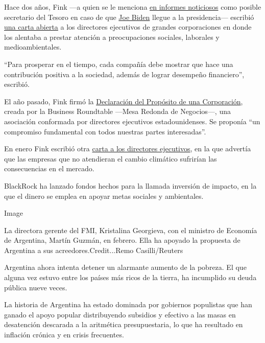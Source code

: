 Hace dos años, Fink ---a quien se le menciona
\href{https://www.cnbc.com/2020/04/06/biden-donors-float-elizabeth-warren-larry-fink-others-for-key-roles.html}{en
informes noticiosos} como posible secretario del Tesoro en caso de que
\href{https://www.nytimes.com/es/interactive/2020/espanol/estados-unidos/joe-biden-elecciones.html}{Joe
Biden} llegue a la presidencia--- escribió
\href{http://www.corporance.es/wp-content/uploads/2018/01/Larry-Fink-letter-to-CEOs-2018-1.pdf}{una
carta abierta} a los directores ejecutivos de grandes corporaciones en
donde los alentaba a prestar atención a preocupaciones sociales,
laborales y medioambientales.

``Para prosperar en el tiempo, cada compañía debe mostrar que hace una
contribución positiva a la sociedad, además de lograr desempeño
financiero'', escribió.

El año pasado, Fink firmó la
\href{https://www.nytimes.com/2019/08/19/business/business-roundtable-ceos-corporations.html}{Declaración
del Propósito de una Corporación}, creada por la Business Roundtable
---Mesa Redonda de Negocios---, una asociación conformada por directores
ejecutivos estadounidenses. Se proponía ``un compromiso fundamental con
todos nuestras partes interesadas''.

En enero Fink escribió otra
\href{https://www.blackrock.com/corporate/investor-relations/larry-fink-ceo-letter}{carta
a los directores ejecutivos}, en la que advertía que las empresas que no
atendieran el cambio climático sufrirían las consecuencias en el
mercado.

BlackRock ha lanzado fondos hechos para la llamada inversión de impacto,
en la que el dinero se emplea en apoyar metas sociales y ambientales.

Image

La directora gerente del FMI, Kristalina Georgieva, con el ministro de
Economía de Argentina, Martín Guzmán, en febrero. Ella ha apoyado la
propuesta de Argentina a sus acreedores.Credit...Remo Casilli/Reuters

Argentina ahora intenta detener un alarmante aumento de la pobreza. El
que alguna vez estuvo entre los países más ricos de la tierra, ha
incumplido su deuda pública nueve veces.

La historia de Argentina ha estado dominada por gobiernos populistas que
han ganado el apoyo popular distribuyendo subsidios y efectivo a las
masas en desatención descarada a la aritmética presupuestaria, lo que ha
resultado en inflación crónica y en crisis frecuentes.

